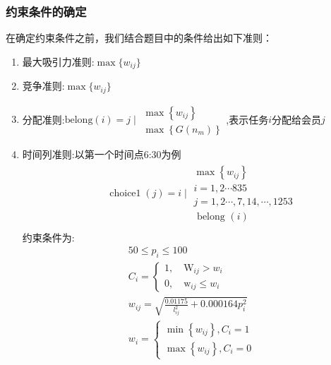 \subsubsection{约束条件的确定}
在确定约束条件之前，我们结合题目中的条件给出如下准则：
\begin{enumerate}
    \item 最大吸引力准则:$\max \{w_{ij}\}$
    \item 竞争准则:$\max\{w_{ij}\}$
    \item 分配准则:$\text {belong}(i)=j \mid \begin{array}{l}
                  \max \left\{w_{i j}\right\} \\
                  \max \left\{G\left(n_{m}\right)\right\}
              \end{array}$,表示任务$i$分配给会员$j$
    \item 时间列准则:以第一个时间点6:30为例
          $$\begin{array}{l}
                  \qquad \operatorname{choice1}(j)=i \mid \begin{array}{l}
                      \max \left\{w_{i j}\right\}      \\
                      i=1,2 \cdots 835                 \\
                      j=1,2 \cdots, 7,14, \cdots, 1253 \\
                      \text { belong }(i)
                  \end{array} \\
              \end{array}$$
          约束条件为:
          $$\begin{array}{c}
                  50 \leq p_{i} \leq 100                                        \\
                  C_{i}=\left\{\begin{array}{l}
                      1, \quad \mathrm{W}_{i j}>w_{i} \\
                      0, \quad \mathrm{w}_{i j} \leq w_{i}
                  \end{array}\right.                 \\
                  w_{i j}=\sqrt{\frac{0.01175}{l_{i j}^{2}}+0.000164 p_{i}^{2}} \\
                  w_{i}=\left\{\begin{array}{c}
                      \min \left\{w_{i j}\right\}, C_{i}=1 \\
                      \max \left\{w_{i j}\right\}, C_{i}=0
                  \end{array}\right.                 \\

\end{array}$$
\end{enumerate}
